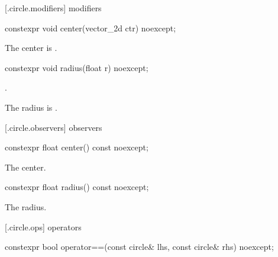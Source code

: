  [\iotwod.circle.modifiers]{ modifiers}

%
\begin{itemdecl}
constexpr void center(vector_2d ctr) noexcept;
\end{itemdecl}

\begin{itemdescr}
\pnum
\effects
The center is .
\end{itemdescr}

%
\begin{itemdecl}
constexpr void radius(float r) noexcept;
\end{itemdecl}
\begin{itemdescr}
\requires
{}.

\pnum
\effects
The radius is .
\end{itemdescr}

 [\iotwod.circle.observers]{ observers}

%
\begin{itemdecl}
constexpr float center() const noexcept;
\end{itemdecl}
\begin{itemdescr}
\pnum
\returns
The center.
\end{itemdescr}

%
\begin{itemdecl}
constexpr float radius() const noexcept;
\end{itemdecl}
\begin{itemdescr}
\pnum
\returns
The radius.
\end{itemdescr}

 [\iotwod.circle.ops] { operators}

%
\begin{itemdecl}
constexpr bool operator==(const circle& lhs, const circle& rhs) noexcept;
\end{itemdecl}
\begin{itemdescr}
\pnum
\returns
{}
\end{itemdescr}
